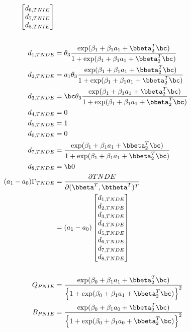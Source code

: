 \documentclass[dvipdfmx,10pt]{article}
\begin{document}
\begin{align*}
\begin{bmatrix}
      d_{6,TNIE}\\
      d_{7,TNIE}\\
      d_{8,TNIE}\\
    \end{bmatrix}\\
  \\
  d_{1,TNDE} &= \theta_{3} \frac
               {\exp(\beta_{1} + \beta_{1}a_{1} + \bbeta_{2}^{T}\bc)}
               {1 + \exp(\beta_{1} + \beta_{1}a_{1} + \bbeta_{2}^{T}\bc)}\\
  d_{2,TNDE} &= a_{1} \theta_{3} \frac
               {\exp(\beta_{1} + \beta_{1}a_{1} + \bbeta_{2}^{T}\bc)}
               {1 + \exp(\beta_{1} + \beta_{1}a_{1} + \bbeta_{2}^{T}\bc)}\\
  d_{3,TNDE} &= \bc \theta_{3} \frac
               {\exp(\beta_{1} + \beta_{1}a_{1} + \bbeta_{2}^{T}\bc)}
               {1 + \exp(\beta_{1} + \beta_{1}a_{1} + \bbeta_{2}^{T}\bc)}\\
  d_{4,TNDE} &= 0\\
  d_{5,TNDE} &= 1\\
  d_{6,TNDE} &= 0\\
  d_{7,TNDE} &= \frac
               {\exp(\beta_{1} + \beta_{1}a_{1} + \bbeta_{2}^{T}\bc)}
               {1 + \exp(\beta_{1} + \beta_{1}a_{1} + \bbeta_{2}^{T}\bc)}\\
  d_{8,TNDE} &= \b0\\
  (a_{1}-a_{0})\Gamma_{TNDE}
  &= \frac{\partial TNDE}{\partial (\bbeta^{T},\btheta^{T})^{T}}\\
  &= (a_{1}-a_{0})
    \begin{bmatrix}
      d_{1,TNDE}\\
      d_{2,TNDE}\\
      d_{3,TNDE}\\
      d_{4,TNDE}\\
      d_{5,TNDE}\\
      d_{6,TNDE}\\
      d_{7,TNDE}\\
      d_{8,TNDE}\\
    \end{bmatrix}\\
  \\
  Q_{PNIE} &= \frac
      {\exp(\beta_{0} + \beta_{1}a_{1} + \bbeta_{2}^{T}\bc)}
      {\left\{ 1 + \exp(\beta_{0} + \beta_{1}a_{1} + \bbeta_{2}^{T}\bc) \right\}^{2}}\\
  B_{PNIE} &= \frac
      {\exp(\beta_{0} + \beta_{1}a_{0} + \bbeta_{2}^{T}\bc)}
      {\left\{ 1 + \exp(\beta_{0} + \beta_{1}a_{0} + \bbeta_{2}^{T}\bc) \right\}^{2}}\\

\end{align*}
\end{document}
